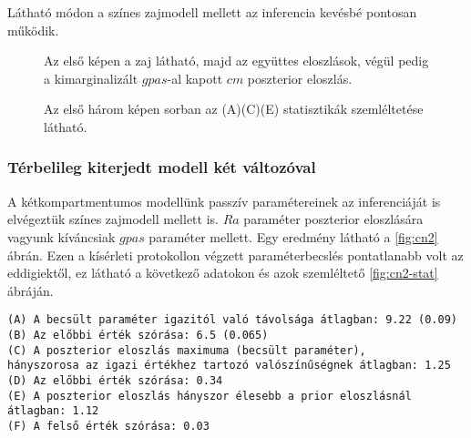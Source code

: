 Látható módon a színes zajmodell mellett az inferencia kevésbé pontosan működik.

\begin{figure}
	\hfill
	\hfill
	\hfill
	\vfill
	\hfill
	\caption[Egykompartmentum, színes zaj, két paraméter inferencia]{Az első képen a zaj látható, majd az együttes eloszlások, végül pedig a kimarginalizált $gpas$-al kapott $cm$ poszterior eloszlás.}%
	\label{fig:cn1}
\end{figure}

\begin{figure}
	\hfill
	\hfill
	\hfill
	\vfill
	\caption[Egykompartmentumos, színes zaj, két paraméter statisztika]{Az első három képen sorban az (A)(C)(E) statisztikák szemléltetése látható.}%
	\label{fig:cn1-stat}
\end{figure}

\FloatBarrier
\subsubsection{Térbelileg kiterjedt modell két változóval}
A kétkompartmentumos modellünk passzív paramétereinek az inferenciáját is elvégeztük színes zajmodell mellett is. $Ra$ paraméter poszterior eloszlására vagyunk kíváncsiak $gpas$ paraméter mellett. Egy eredmény látható a \ref{fig:cn2} ábrán. Ezen a kísérleti protokollon végzett paraméterbecslés pontatlanabb volt az eddigiektől, ez látható a következő adatokon és azok szemléltető \ref{fig:cn2-stat} ábráján.

\begin{verbatim}
(A) A becsült paraméter igazitól való távolsága átlagban: 9.22 (0.09)
(B) Az előbbi érték szórása: 6.5 (0.065)
(C) A poszterior eloszlás maximuma (becsült paraméter), 
hányszorosa az igazi értékhez tartozó valószínűségnek átlagban: 1.25
(D) Az előbbi érték szórása: 0.34
(E) A poszterior eloszlás hányszor élesebb a prior eloszlásnál átlagban: 1.12
(F) A felső érték szórása: 0.03
\end{verbatim}


